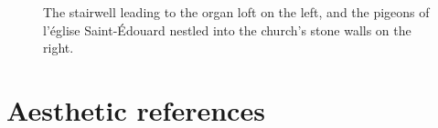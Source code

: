 \documentclass[12pt,twoside,maitrise]{dms_ks}
\theoremstyle{definition}
\begin{document}
\begin{figure}[h]
    \centering
    \caption{The stairwell leading to the organ loft on the left, and the pigeons of l'église Saint-Édouard nestled into the church's stone walls on the right.}
    \label{fig:sidebyside}
\end{figure}

\section{Aesthetic references}
\end{document}
